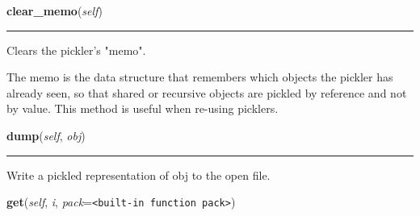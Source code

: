 \hspace{.8\funcindent}\begin{boxedminipage}{\funcwidth}

    \raggedright \textbf{clear\_memo}(\textit{self})

    \vspace{-1.5ex}

    \rule{\textwidth}{0.5\fboxrule}
\setlength{\parskip}{2ex}
    Clears the pickler's "memo".

    The memo is the data structure that remembers which objects the pickler
    has already seen, so that shared or recursive objects are pickled by 
    reference and not by value.  This method is useful when re-using 
    picklers.

\setlength{\parskip}{1ex}
    \end{boxedminipage}

    \label{pickle:Pickler:dump}

    \vspace{0.5ex}

\hspace{.8\funcindent}\begin{boxedminipage}{\funcwidth}

    \raggedright \textbf{dump}(\textit{self}, \textit{obj})

    \vspace{-1.5ex}

    \rule{\textwidth}{0.5\fboxrule}
\setlength{\parskip}{2ex}
    Write a pickled representation of obj to the open file.

\setlength{\parskip}{1ex}
    \end{boxedminipage}

    \label{pickle:Pickler:get}

    \vspace{0.5ex}

\hspace{.8\funcindent}\begin{boxedminipage}{\funcwidth}

    \raggedright \textbf{get}(\textit{self}, \textit{i}, \textit{pack}={\tt {\textless}built-in function pack{\textgreater}})

\setlength{\parskip}{2ex}
\setlength{\parskip}{1ex}
    \end{boxedminipage}

    \label{pickle:Pickler:memoize}

